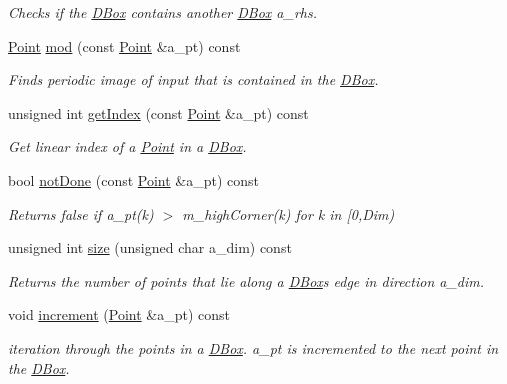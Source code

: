 \begin{DoxyCompactItemize}
\begin{DoxyCompactList}\small\item\em Checks if the \hyperlink{class_d_box}{D\+Box} contains another \hyperlink{class_d_box}{D\+Box} a\+\_\+rhs. \end{DoxyCompactList}\item 
\hyperlink{class_point}{Point} \hyperlink{class_d_box_a60558669bcb1b761aab592c0d70b64ce}{mod} (const \hyperlink{class_point}{Point} \&a\+\_\+pt) const
\begin{DoxyCompactList}\small\item\em Finds periodic image of input that is contained in the \hyperlink{class_d_box}{D\+Box}. \end{DoxyCompactList}\item 
unsigned int \hyperlink{class_d_box_a396f1e736d888714c2016307511427e1}{get\+Index} (const \hyperlink{class_point}{Point} \&a\+\_\+pt) const
\begin{DoxyCompactList}\small\item\em Get linear index of a \hyperlink{class_point}{Point} in a \hyperlink{class_d_box}{D\+Box}. \end{DoxyCompactList}\item 
\mbox{\label{class_d_box_a665640a1cbeb53323c821167f0038a93}} 
bool \hyperlink{class_d_box_a665640a1cbeb53323c821167f0038a93}{not\+Done} (const \hyperlink{class_point}{Point} \&a\+\_\+pt) const
\begin{DoxyCompactList}\small\item\em Returns false if a\+\_\+pt(k) $>$ m\+\_\+high\+Corner(k) for k in \mbox{[}0,Dim) \end{DoxyCompactList}\item 
unsigned int \hyperlink{class_d_box_a9f3523e560c447da80e405afbcb5b0ea}{size} (unsigned char a\+\_\+dim) const
\begin{DoxyCompactList}\small\item\em Returns the number of points that lie along a \hyperlink{class_d_box}{D\+Box}\textquotesingle{}s edge in direction a\+\_\+dim. \end{DoxyCompactList}\item 
void \hyperlink{class_d_box_a311d4205afe6a3454874f6e07ea1e935}{increment} (\hyperlink{class_point}{Point} \&a\+\_\+pt) const
\begin{DoxyCompactList}\small\item\em iteration through the points in a \hyperlink{class_d_box}{D\+Box}. a\+\_\+pt is incremented to the next point in the \hyperlink{class_d_box}{D\+Box}. \end{DoxyCompactList}\item 

\end{DoxyCompactItemize}
